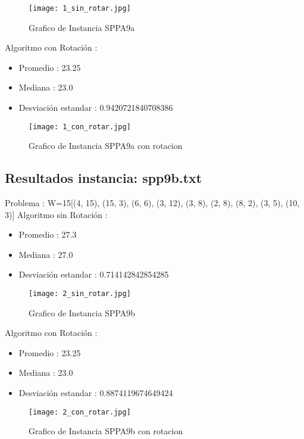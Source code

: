 \documentclass[10pt]{article}
\begin{document}
\begin{figure}[H]
\centerline{\texttt{[image: 1\_sin\_rotar.jpg]}}
\caption{Grafico de Instancia SPPA9a }
\label{fig_1}
\end{figure}

Algoritmo con Rotación : %
\begin{itemize}%
\item%
Promedio : 23.25%
\item%
Mediana : 23.0%
\item%
Desviación estandar : 0.9420721840708386%
\end{itemize}%

\begin{figure}[H]
\centerline{\texttt{[image: 1\_con\_rotar.jpg]}}
\caption{Grafico de Instancia SPPA9a con rotacion }
\label{fig_2}
\end{figure}

\subsection{Resultados instancia: spp9b.txt}%
\label{subsec:Resultadosinstanciaspp9b.txt}%
Problema : W=15{[}(4, 15), (15, 3), (6, 6), (3, 12), (3, 8), (2, 8), (8, 2), (3, 5), (10, 3){]} \newline%
%
 Algoritmo sin Rotación : %
\begin{itemize}%
\item%
Promedio : 27.3%
\item%
Mediana : 27.0%
\item%
Desviación estandar : 0.714142842854285%
\end{itemize}

\begin{figure}[H]
\centerline{\texttt{[image: 2\_sin\_rotar.jpg]}}
\caption{Grafico de Instancia SPPA9b }
\label{fig_3}
\end{figure} 

%
Algoritmo con Rotación : %
\begin{itemize}%
\item%
Promedio : 23.25%
\item%
Mediana : 23.0%
\item%
Desviación estandar : 0.8874119674649424%
\end{itemize}%

\begin{figure}[H]
\centerline{\texttt{[image: 2\_con\_rotar.jpg]}}
\caption{Grafico de Instancia SPPA9b con rotacion}
\label{fig_4}
\end{figure} 
\end{document}
